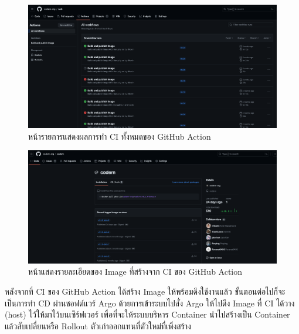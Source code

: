 \documentclass[12pt,one side,openright,a4paper]{cpe-thesis-th}
\newcommand{\thaijustify}[1]{%
  \par\hspace{30pt}\justifying
  #1
}
\begin{document}
            \begin{figure}[H]
                \centering
                \includegraphics[width=12cm]{figure/results/gh-action-ci.png}
                \caption[หน้ารายการผลการทำ CI ทั้งหมดของ GitHub Actions]{หน้ารายการแสดงผลการทำ CI ทั้งหมดของ GitHub Action}
                \label{fig:res-gh-action-ci}
            \end{figure}
            \begin{figure}[H]
                \centering
                \includegraphics[width=12cm]{figure/results/gh-action-pkg.png}
                \caption[Image ของซอฟต์แวร์จากการทำ CI ของ GitHub Action]{หน้าแสดงรายละเอียดของ Image ที่สร้างจาก CI ของ GitHub Action}
                \label{fig:res-gh-action-pkg}
            \end{figure}
            \thaijustify{
                หลังจากที่ CI ของ GitHub Action ได้สร้าง Image ให้พร้อมดึงใช้งานแล้ว ขั้นตอนต่อไปก็จะเป็นการทำ CD ผ่านซอฟต์แวร์ Argo ด้วยการเข้าระบบไปสั่ง Argo ให้ไปดึง Image ที่ CI ได้วาง (host) ไว้ให้มาไว้บนเซิร์ฟเวอร์ เพื่อที่จะให้ระบบบริหาร Container นำไปสร้างเป็น Container แล้วสับเปลี่ยนหรือ Rollout ตัวเก่าออกแทนที่ตัวใหม่ที่เพิ่งสร้าง  
            }
\end{document}
